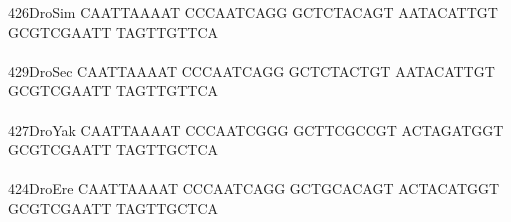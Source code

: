 \documentclass[11pt,twoside,reqno,a4paper]{article}
\begin{document}
{426\hspace*{1\charwidth}DroSim	CAATTAAAAT	CCCAATCAGG	GCTCTACAGT	AATACATTGT	GCGTCGAATT	TAGTTGTTCA	\\
\hspace*{4\charwidth}\hspace*{7\charwidth}\hspace*{1\charwidth}\hspace*{1\charwidth}\hspace*{1\charwidth}\hspace*{1\charwidth}\hspace*{1\charwidth}\hspace*{1\charwidth}\\
429\hspace*{1\charwidth}DroSec	CAATTAAAAT	CCCAATCAGG	GCTCTACTGT	AATACATTGT	GCGTCGAATT	TAGTTGTTCA	\\
\hspace*{4\charwidth}\hspace*{7\charwidth}\hspace*{1\charwidth}\hspace*{1\charwidth}\hspace*{1\charwidth}\hspace*{1\charwidth}\hspace*{1\charwidth}\hspace*{1\charwidth}\\
427\hspace*{1\charwidth}DroYak	CAATTAAAAT	CCCAATCGGG	GCTTCGCCGT	ACTAGATGGT	GCGTCGAATT	TAGTTGCTCA	\\
\hspace*{4\charwidth}\hspace*{7\charwidth}\hspace*{1\charwidth}\hspace*{1\charwidth}\hspace*{1\charwidth}\hspace*{1\charwidth}\hspace*{1\charwidth}\hspace*{1\charwidth}\\
424\hspace*{1\charwidth}DroEre	CAATTAAAAT	CCCAATCAGG	GCTGCACAGT	ACTACATGGT	GCGTCGAATT	TAGTTGCTCA	\\
\hspace*{4\charwidth}\hspace*{7\charwidth}\hspace*{1\charwidth}\hspace*{1\charwidth}\hspace*{1\charwidth}\hspace*{1\charwidth}\hspace*{1\charwidth}\hspace*{1\charwidth}\\
}
\end{document}
